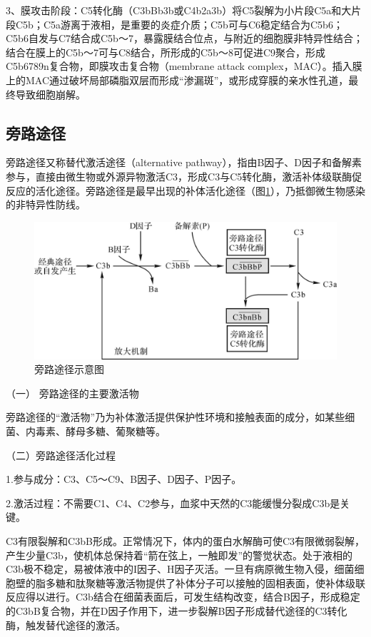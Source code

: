 3、膜攻击阶段：C5转化酶（C3bBb3b或C4b2a3b）将C5裂解为小片段C5a和大片段C5b；C5a游离于液相，是重要的炎症介质；C5b可与C6稳定结合为C5b6；C5b6自发与C7结合成C5b～7，暴露膜结合位点，与附近的细胞膜非特异性结合；结合在膜上的C5b～7可与C8结合，所形成的C5b～8可促进C9聚合，形成C5b6789n复合物，即膜攻击复合物（membrane
attack
complex，MAC）。插入膜上的MAC通过破坏局部磷脂双层而形成“渗漏斑”，或形成穿膜的亲水性孔道，最终导致细胞崩解。


\subsection{旁路途径}

旁路途径又称替代激活途径（alternative
pathway），指由B因子、D因子和备解素参与，直接由微生物或外源异物激活C3，形成C3与C5转化酶，激活补体级联酶促反应的活化途径。旁路途径是最早出现的补体活化途径（图\ref{fig5-4}），乃抵御微生物感染的非特异性防线。

\begin{figure}[!htbp]
 \centering
 \includegraphics{./images/Image00082.jpg}
 \captionsetup{justification=centering}
 \caption{旁路途径示意图}
 \label{fig5-4}
  \end{figure} 

（一） 旁路途径的主要激活物

旁路途径的“激活物”乃为补体激活提供保护性环境和接触表面的成分，如某些细菌、内毒素、酵母多糖、葡聚糖等。

（二）旁路途径活化过程

1.参与成分：C3、C5～C9、B因子、D因子、P因子。

2.激活过程：不需要C1、C4、C2参与，血浆中天然的C3能缓慢分裂成C3b是关键。

C3有限裂解和C3bB形成。正常情况下，体内的蛋白水解酶可使C3有限微弱裂解，产生少量C3b，使机体总保持着“箭在弦上，一触即发”的警觉状态。处于液相的C3b极不稳定，易被体液中的I因子、H因子灭活。一旦有病原微生物入侵，细菌细胞壁的脂多糖和肽聚糖等激活物提供了补体分子可以接触的固相表面，使补体级联反应得以进行。C3b结合在细菌表面后，可发生结构改变，结合B因子，形成稳定的C3bB复合物，并在D因子作用下，进一步裂解B因子形成替代途径的C3转化酶，触发替代途径的激活。

